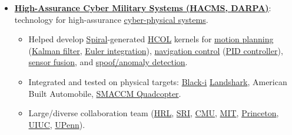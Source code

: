 \documentclass{article}
\begin{document}
\begin{itemize}

\item \textbf{\href{http://www.darpa.mil/Our_Work/I2O/Programs/High-Assurance_Cyber_Military_Systems_(HACMS).aspx}{High-Assurance Cyber Military Systems (HACMS, \href{http://www.darpa.mil/default.aspx}{DARPA})}}: technology for high-assurance \href{https://en.wikipedia.org/wiki/Cyber-physical_system}{cyber-physical systems}. 

  \begin{itemize}
    \item Helped develop \href{http://spiral.net/}{Spiral}-generated \href{https://wiki.hh.se/wg211/images/e/e0/M13Franchetti.pdf}{HCOL} kernels for \href{https://en.wikipedia.org/wiki/Motion_planning}{motion planning} (\href{https://en.wikipedia.org/wiki/Kalman_filter}{Kalman filter}, \href{http://en.wikipedia.org/wiki/Euler_method}{Euler integration}), \href{https://en.wikipedia.org/wiki/Mobile_robot_navigation}{navigation control} (\href{http://en.wikipedia.org/wiki/PID_controller}{PID controller}), \href{https://en.wikipedia.org/wiki/Sensor_fusion}{sensor fusion}, and \href{https://en.wikipedia.org/wiki/Anomaly_detection}{spoof/anomaly detection}.



    \item Integrated and tested on physical targets: \href{http://blackirobotics.com/DARPA-SN-12-26_HACMS.php}{Black-i} \href{http://www.blackirobotics.com/LandShark_UGV_UC0M.html}{Landshark}, American Built Automobile, \href{http://smaccmpilot.org/}{SMACCM Quadcopter}. 

    \item Large/diverse collaboration team (\href{http://www.hrl.com/}{HRL}, \href{http://www.sri.com/}{SRI}, \href{http://www.cmu.edu/}{CMU}, \href{http://web.mit.edu/}{MIT}, \href{http://www.princeton.edu/}{Princeton}, \href{http://illinois.edu/}{UIUC}, \href{http://www.upenn.edu/}{UPenn}).


\end{itemize}
\end{itemize}
\end{document}
